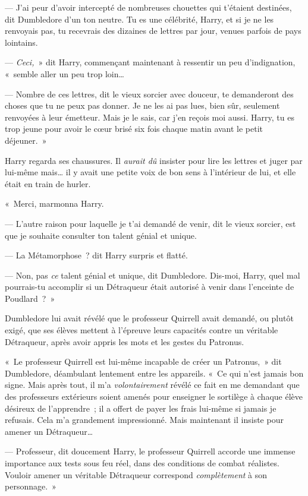 --- J'ai peur d'avoir intercepté de nombreuses chouettes qui t'étaient destinées, dit Dumbledore d'un ton neutre. Tu es une célébrité, Harry, et si je ne les renvoyais pas, tu recevrais des dizaines de lettres par jour, venues parfois de pays lointains.

--- \emph{Ceci,}~» dit Harry, commençant maintenant à ressentir un peu d'indignation, «~semble aller un peu trop loin…

--- Nombre de ces lettres, dit le vieux sorcier avec douceur, te demanderont des choses que tu ne peux pas donner. Je ne les ai pas lues, bien sûr, seulement renvoyées à leur émetteur. Mais je le sais, car j'en reçois moi aussi. Harry, tu es trop jeune pour avoir le cœur brisé six fois chaque matin avant le petit déjeuner.~»

Harry regarda ses chaussures. Il \emph{aurait dû} insister pour lire les lettres et juger par lui-même mais… il y avait une petite voix de bon sens à l'intérieur de lui, et elle était en train de hurler.

«~Merci, marmonna Harry.

--- L'autre raison pour laquelle je t'ai demandé de venir, dit le vieux sorcier, est que je souhaite consulter ton talent génial et unique.

--- La Métamorphose~? dit Harry surpris et flatté.

--- Non, pas \emph{ce} talent génial et unique, dit Dumbledore. Dis-moi, Harry, quel mal pourrais-tu accomplir si un Détraqueur était autorisé à venir dans l'enceinte de Poudlard~?~»

\later

Dumbledore lui avait révélé que le professeur Quirrell avait demandé, ou plutôt exigé, que ses élèves mettent à l'épreuve leurs capacités contre un véritable Détraqueur, après avoir appris les mots et les gestes du Patronus.

«~Le professeur Quirrell est lui-même incapable de créer un Patronus,~» dit Dumbledore, déambulant lentement entre les appareils. «~Ce qui n'est jamais bon signe. Mais après tout, il m'a \emph{volontairement} révélé ce fait en me demandant que des professeurs extérieurs soient amenés pour enseigner le sortilège à chaque élève désireux de l'apprendre~; il a offert de payer les frais lui-même si jamais je refusais. Cela m'a grandement impressionné. Mais maintenant il insiste pour amener un Détraqueur…

--- Professeur, dit doucement Harry, le professeur Quirrell accorde une immense importance aux tests sous feu réel, dans des conditions de combat réalistes. Vouloir amener un véritable Détraqueur correspond \emph{complètement} à son personnage.~»

